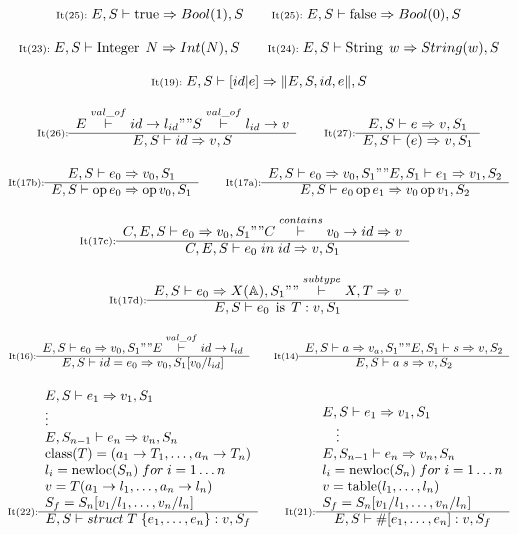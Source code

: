 {
\footnotesize
\[
\textnormal{{\scriptsize It(25):}}\; E, S\vdash\operatorname{true}\Rightarrow Bool(1),S
\quad\quad
\textnormal{{\scriptsize It(25):}}\; E, S\vdash\operatorname{false}\Rightarrow Bool(0),S
\]

\[
\textnormal{{\scriptsize It(23):}}\; E, S\vdash\operatorname{Integer}\; N\Rightarrow Int(N),S
\quad\quad
\textnormal{{\scriptsize It(24):}}\; E, S\vdash\operatorname{String}\; w\Rightarrow String(w),S
\]

\[
\textnormal{{\scriptsize It(19):}}\; E, S\vdash \left[id \vert e \right] \Rightarrow \lVert E,S, id, e\rVert,S
\]

\[
\inference[It(26):]{
E\overset{val\_of}{|-}id->l_{id} "" S\overset{val\_of}{|-}l_{id}->v
}{E, S|-id=>v,S}
\quad\quad
\inference[It(27):]{
E, S|-e=>v,S_1
}
{E, S|-(e)=>v,S_1}
\]

\[
\inference[It(17b):]{
E, S|-e_0=>v_0,S_1
}{E, S|-\operatorname{op}e_0=>\operatorname{op}v_0,S_1}
\quad\quad
\inference[It(17a):]{
E, S|-e_0=>v_0,S_1 "" E, S_1|-e_1=>v_1,S_2
}{E, S|-e_0\operatorname{op}e_1=>v_0\operatorname{op}v_1,S_2}
\]

\[
\inference[It(17c):]{
C, E, S|-e_0=>v_0,S_1 "" C \overset {contains} {|-} v_0->id =>v
}{C, E, S|-e_0 \; in \; id=>v,S_1}
\quad\quad
\]

\[
\inference[It(17d):]{
E, S|-e_0=>X(\mathbb{A}),S_1 "" \overset{subtype}{|-} X, T \Rightarrow v
}{E, S|-e_0\; \operatorname{is} \; T:v,S_1}
\]

\[
\inference[It(16):]
{
E,S|-e_0=>v_0,S_1 "" E\overset{val\_of}{|-}id->l_{id}
}
{E, S|-id = e_0=>v_0, S_1[v_0/l_{id}]}
\quad\quad
\inference[It(14)]
{
E, S|-a=>v_a,S_1 "" E, S_1|-s=>v,S_2
}
{E, S|-a\;s=>v,S_2}
\]

\[
\inference[It(22):]
{
E,S|-e_1=>v_1,S_1 \\
\vdots \\
E,S_{n-1}|-e_n=>v_n,S_n \\
\operatorname{class}(T)=(a_1->T_1, \dots, a_n->T_n) \\  %
l_i = \operatorname{newloc}(S_n) \; for \; i = 1 \dots n \\
v=T(a_1->l_1, \dots, a_n->l_n) \\ %
S_f = S_n[v_1/l_1, \dots, v_n/l_n]
}
{E, S|-struct\;T\;\{ e_1, \ldots, e_n \}:v,S_f}
\quad\quad
\inference[It(21):]
{
E,S|-e_1=>v_1,S_1 \\
\quad \vdots \\
E,S_{n-1}|-e_n=>v_n,S_n \\
l_i = \operatorname{newloc}(S_n) \; for \; i = 1 \dots n \\
v=\operatorname{table}(l_1, \dots, l_n) \\
S_f = S_n[v_1/l_1, \dots, v_n/l_n]
}
{E, S|-\#[e_1, \dots, e_n]:v,S_f}
\]

}
